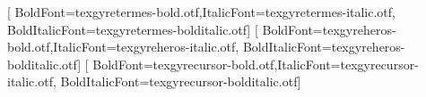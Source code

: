 \usepackage{iftex}
\ifXeTeX
  \usepackage{fontspec}
  \setmainfont{texgyretermes-regular.otf}[
    BoldFont=texgyretermes-bold.otf,ItalicFont=texgyretermes-italic.otf,
    BoldItalicFont=texgyretermes-bolditalic.otf]
  \setsansfont{texgyreheros-regular.otf}[
    BoldFont=texgyreheros-bold.otf,ItalicFont=texgyreheros-italic.otf,
    BoldItalicFont=texgyreheros-bolditalic.otf]
  \setmonofont{texgyrecursor-regular.otf}[
    BoldFont=texgyrecursor-bold.otf,ItalicFont=texgyrecursor-italic.otf,
    BoldItalicFont=texgyrecursor-bolditalic.otf]
\fi
